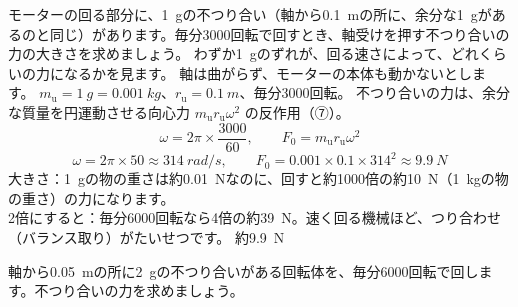 \label{ph:波-2:ex6}
\begin{phreidai}[小さな不つり合いの大きな力]
モーターの回る部分に、\qty{1}{g}の不つり合い（軸から\qty{0.1}{m}の所に、余分な\qty{1}{g}があるのと同じ）があります。毎分3000回転で回すとき、軸受けを押す不つり合いの力の大きさを求めましょう。
\phbamen
わずか\qty{1}{g}のずれが、回る速さによって、どれくらいの力になるかを見ます。
\phmushi
軸は曲がらず、モーターの本体も動かないとします。
\phzu
$m_{\mathrm u}=\qty{1}{g}=\qty{0.001}{kg}$、$r_{\mathrm u}=\qty{0.1}{m}$、毎分3000回転。
\phriyu
不つり合いの力は、余分な質量を円運動させる向心力 $m_{\mathrm u}r_{\mathrm u}\omega^2$ の反作用（⑦）。
\phtateru
\[\omega=2\pi\times\frac{3000}{60},\qquad F_0=m_{\mathrm u}r_{\mathrm u}\omega^2\]
\phtoku
\[\omega=2\pi\times50\approx\qty{314}{rad/s},\qquad F_0=0.001\times0.1\times314^2\approx\qty{9.9}{N}\]
\phtashikame
大きさ：\qty{1}{g}の物の重さは約\qty{0.01}{N}なのに、回すと約1000倍の約\qty{10}{N}（\qty{1}{kg}の物の重さ）の力になります。\\
2倍にすると：毎分6000回転なら4倍の約\qty{39}{N}。速く回る機械ほど、つり合わせ（バランス取り）がたいせつです。
\kotae 約\qty{9.9}{N}
\end{phreidai}
\begin{jibun}
軸から\qty{0.05}{m}の所に\qty{2}{g}の不つり合いがある回転体を、毎分6000回転で回します。不つり合いの力を求めましょう。
\end{jibun}

